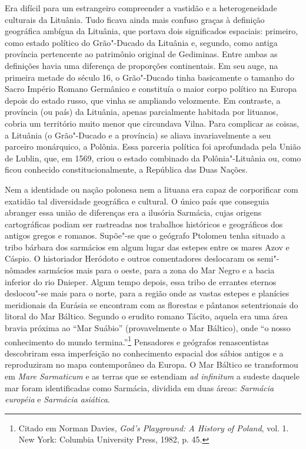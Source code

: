 Era difícil para um estrangeiro compreender a vastidão e a
heterogeneidade culturais da Lituânia. Tudo ficava ainda mais confuso
graças à definição geográfica ambígua da Lituânia, que portava dois
significados espaciais: primeiro, como estado político do Grão"-Ducado da
Lituânia e, segundo, como antiga província pertencente ao patrimônio
original de Gediminas. Entre ambas as definições havia uma diferença de
proporções continentais. Em seu auge, na primeira metade do século 16, o
Grão"-Ducado tinha basicamente o tamanho do Sacro Império Romano
Germânico e constituía o maior corpo político na Europa depois do estado
russo, que vinha se ampliando velozmente. Em contraste, a província (ou
país) da Lituânia, apenas parcialmente habitada por lituanos, cobria um
território muito menor que circundava Vilna. Para complicar as coisas, a
Lituânia (o Grão"-Ducado e a província) se aliava invariavelmente a seu
parceiro monárquico, a Polônia. Essa parceria política foi aprofundada
pela União de Lublin, que, em 1569, criou o estado combinado da
Polônia"-Lituânia ou, como ficou conhecido constitucionalmente, a
República das Duas Nações.

%

\asterisc

Nem a identidade ou nação polonesa nem a lituana era capaz de
corporificar com exatidão tal diversidade geográfica e cultural. O único
país que conseguia abranger essa união de diferenças era a ilusória
Sarmácia, cujas origens cartográficas podiam ser rastreadas nos
trabalhos históricos e geográficos dos antigos gregos e romanos.
Supõe"-se que o geógrafo Ptolomeu tenha situado a tribo bárbara dos
sarmácios em algum lugar das estepes entre os mares Azov e Cáspio. O
historiador Heródoto e outros comentadores deslocaram os semi"-nômades
sarmácios mais para o oeste, para a zona do Mar Negro e a bacia inferior
do rio Dnieper. Algum tempo depois, essa tribo de errantes eternos
deslocou"-se mais para o norte, para a região onde as vastas estepes e
planícies meridionais da Eurásia se encontram com as florestas e
pântanos setentrionais do litoral do Mar Báltico. Segundo o erudito
romano Tácito, aquela era uma área bravia próxima ao ``Mar Suábio''
(provavelmente o Mar Báltico), onde ``o nosso conhecimento do mundo
termina.''\footnote{Citado em Norman Davies, \emph{God's Playground: A
  History of Poland}, vol. 1. New York: Columbia University Press, 1982,
  p. 45.} Pensadores e geógrafos renascentistas descobriram essa
imperfeição no conhecimento espacial dos sábios antigos e a reproduziram
no mapa contemporâneo da Europa. O Mar Báltico se transformou em
\emph{Mare Sarmaticum} e as terras que se estendiam \emph{ad infinitum}
a sudeste daquele mar foram identificadas como Sarmácia, dividida em
duas áreas: \emph{Sarmácia européia} e \emph{Sarmácia asiática}.

